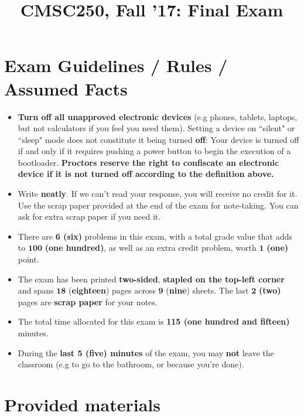 \documentclass[letterpaper,10pt]{article}
\title{CMSC250, Fall '17: Final Exam}
\begin{document}

\vspace{-.2in}

\section*{Exam Guidelines / Rules / Assumed Facts}
\label{sec:guidelines}
 
\begin{itemize}
	\item \textbf{Turn off all unapproved electronic devices} (e.g phones, tablets, laptops, but not calculators if you feel you need them). Setting a device on ``silent" or ``sleep" mode does not constitute it being turned \textbf{off}: Your device is turned off if and only if it requires pushing a power button to begin the execution of a bootloader. \textbf{Proctors reserve the right to confiscate an electronic device if it is not turned off according to the definition above.}
	\item Write \textbf{neatly}. If we can't read your response, you will receive no credit for it. Use the scrap paper provided at the end of the exam for note-taking. You can ask for extra scrap paper if you need it.
	\item There are \textbf{6 (six)} problems in this exam, with a total grade value that adds to $\mathbf{100}$ \textbf{(one hundred)}, as well as an extra credit problem, worth $\mathbf 1$ {\bf (one)} point.
	\item The exam  has been printed \textbf{two-sided}, \textbf{stapled on the top-left corner} and spans $\mathbf{18}$  (\textbf{eighteen}) pages across $\mathbf{9}$ (\textbf{nine}) sheets. The last $\mathbf{2}$ {\bf (two)}  pages are \textbf{scrap paper} for your notes. 
	\item The total time allocated for this exam is \textbf{115 (one hundred and fifteen)} minutes.
	\item During the \textbf{last 5 (five) minutes} of the exam, you may \textbf{not} leave the classroom (e.g to go to the bathroom, or because you're done). 
	
\end{itemize}

\pagebreak

\section*{Provided materials}
\end{document}
